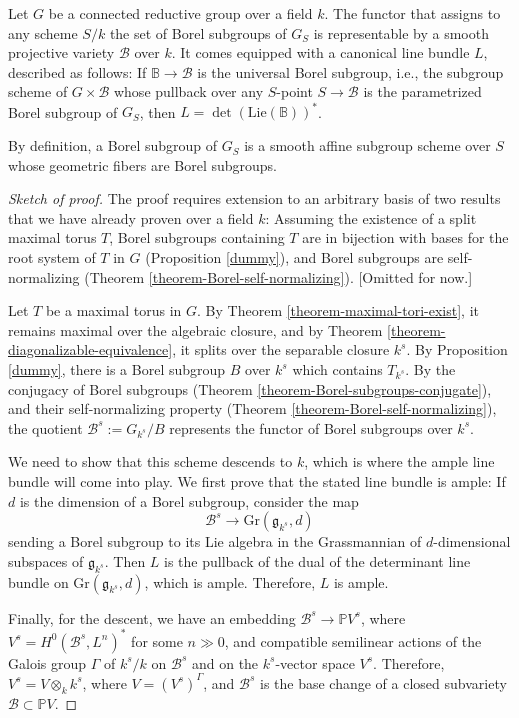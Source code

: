 \begin{theorem}
 \label{theorem-variety-of-Borels}
Let $G$ be a connected reductive group over a field $k$. The functor that assigns to any scheme $S/k$ the set of Borel subgroups of $G_S$ is representable by a smooth projective variety $\mathcal B$ over $k$. It comes equipped with a canonical line bundle $L$, described as follows: If $\mathbb B\to \mathcal B$ is the universal Borel subgroup, i.e., the subgroup scheme of $G\times \mathcal B$ whose pullback over any $S$-point $S\to \mathcal B$ is the parametrized Borel subgroup of $G_S$, then $L=\det(\text{Lie}(\mathbb B))^*$.
\end{theorem}

By definition, a Borel subgroup of $G_S$ is a smooth affine subgroup scheme over $S$ whose geometric fibers are Borel subgroups. 

\begin{proof}[Sketch of proof]
 The proof requires extension to an arbitrary basis of two results that we have already proven over a field $k$: Assuming the existence of a split maximal torus $T$, Borel subgroups containing $T$ are in bijection with bases for the root system of $T$ in $G$ (Proposition \ref{dummy}), and Borel subgroups are self-normalizing (Theorem \ref{theorem-Borel-self-normalizing}). [Omitted for now.]
 
 Let $T$ be a maximal torus in $G$. By Theorem \ref{theorem-maximal-tori-exist}, it remains maximal over the algebraic closure, and by  Theorem \ref{theorem-diagonalizable-equivalence}, it splits over the separable closure $k^s$. By Proposition \ref{dummy}, there is a Borel subgroup $B$ over $k^s$ which contains $T_{k^s}$. By the conjugacy of Borel subgroups (Theorem \ref{theorem-Borel-subgroups-conjugate}), and their self-normalizing property (Theorem \ref{theorem-Borel-self-normalizing}), the quotient $\mathcal B^s:=G_{k^s}/B$ represents the functor of Borel subgroups over $k^s$. 
 
 We need to show that this scheme descends to $k$, which is where the ample line bundle will come into play. We first prove that the stated line bundle is ample: If $d$ is the dimension of a Borel subgroup, consider the map 
 $$ \mathcal B^s \to \text{Gr}(\mathfrak g_{k^s}, d)$$
 sending a Borel subgroup to its Lie algebra in the Grassmannian of $d$-dimensional subspaces of $\mathfrak g_{k^s}$. Then $L$ is the pullback of the dual of the determinant line bundle on $\text{Gr}(\mathfrak g_{k^s}, d)$, which is ample. Therefore, $L$ is ample.
 
 Finally, for the descent, we have an embedding $\mathcal B^s\to \mathbb P V^s$, where $V^s = H^0(\mathcal B^s, L^n)^*$ for some $n\gg 0$, and compatible semilinear actions of the Galois group $\Gamma$ of $k^s/k$ on $\mathcal B^s$ and on the $k^s$-vector space $V^s$. Therefore, $V^s = V \otimes_k k^s$, where $V = (V^s)^\Gamma$, and $\mathcal B^s$ is the base change of a closed subvariety $\mathcal B \subset \mathbb P V$.
\end{proof}


